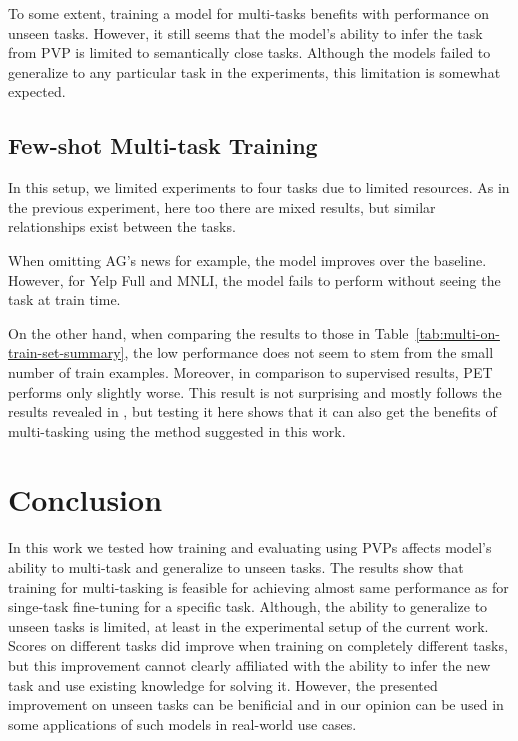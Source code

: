\documentclass[11pt,a4paper]{article}
\begin{document}
To some extent, training a model for multi-tasks benefits with performance on unseen tasks.
However, it still seems that the model's ability to infer the task from PVP is limited to semantically close tasks.
Although the models failed to generalize to any particular task in the experiments, this limitation is somewhat expected.

\subsection{Few-shot Multi-task Training}
In this setup, we limited experiments to four tasks due to limited resources.
As in the previous experiment, here too there are mixed results, but similar relationships exist between the tasks.

When omitting AG's news for example, the model improves over the baseline.
However, for Yelp Full and MNLI, the model fails to perform without seeing the task at train time.

On the other hand, when comparing the results to those in Table~\ref{tab:multi-on-train-set-summary},
the low performance does not seem to stem from the small number of train examples.
Moreover, in comparison to supervised results, PET performs only slightly worse.
This result is not surprising and mostly follows the results revealed in \citet{schick2020exploiting}, but testing it here shows that it can also get the benefits of multi-tasking using the method suggested in this work.

\section{Conclusion}
In this work we tested how training and evaluating using PVPs affects model's ability to multi-task and generalize to unseen tasks.
The results show that training for multi-tasking is feasible for achieving almost same performance as for singe-task fine-tuning for a specific task.
Although, the ability to generalize to unseen tasks is limited, at least in the experimental setup of the current work.
Scores on different tasks did improve when training on completely different tasks, but this improvement cannot clearly affiliated with the ability to infer the new task and use existing knowledge for solving it. 
However, the presented improvement on unseen tasks can be benificial and in our opinion can be used in some applications of such models in real-world use cases. 



\end{document}
